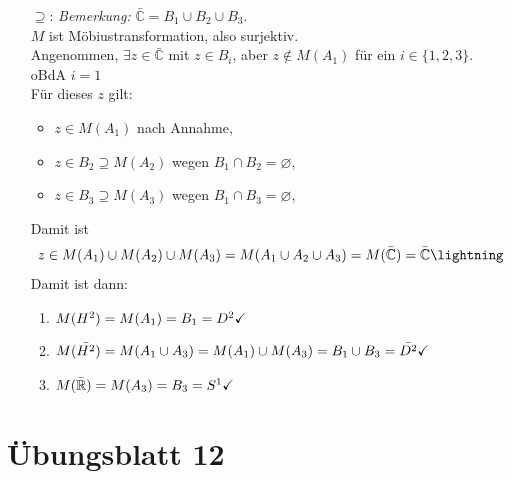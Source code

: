\begin{solution}
\begin{itemize}
    \item[\( \supseteq \):] \emph{Bemerkung:} \( \bar{\mathbb{C}} = B_1 \cup B_2 \cup B_3 \). \\
    \( M \) ist Möbiustransformation, also surjektiv. \\
    Angenommen, \( \exists z \in \bar{\mathbb{C}} \) mit \( z \in B_i \), aber \( z \notin M(A_1) \) für ein \( i \in \{ 1, 2, 3 \} \). \\
    oBdA \( i = 1 \) \\
    Für dieses \( z \) gilt:
    \begin{itemize}
      \item \( z \in M(A_1) \) nach Annahme,
      \item \( z \in B_2 \supseteq M(A_2) \) wegen \( B_1 \cap B_2 = \varnothing \),
      \item \( z \in B_3 \supseteq M(A_3) \) wegen \( B_1 \cap B_3 = \varnothing \),
    \end{itemize}
    Damit ist
    \begin{equation*}
      z \in M(A_1) \cup M(A_2) \cup M(A_3) = M(A_1 \cup A_2 \cup A_3) = M(\bar{\mathbb{C}}) = \bar{\mathbb{C}} \hfill \lightning
    \end{equation*}
    Damit ist dann:
    \begin{enumerate}[label= (\alph*)] 
      \item \( M(H^2) = M(A_1) = B_1 = D^2 \hfill \checkmark \) 
      \item \( M(\bar{H^2}) = M(A_1 \cup A_3) = M(A_1) \cup M(A_3) = B_1 \cup B_3 = \bar{D^2} \hfill \checkmark \) 
      \item \( M(\bar{ \mathbb{R}}) = M(A_3) = B_3 = S^1 \hfill \checkmark \) \\
    \end{enumerate}
  \end{itemize}
\end{solution}

%
\section{Übungsblatt 12}
\setcounter{problemcounter}{0}

